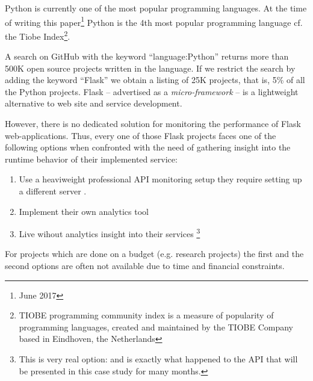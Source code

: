 \documentclass[conference]{IEEEtran}
\begin{document}
 

Python is currently one of the most popular programming languages. At the time of writing this paper\footnote{June 2017} Python is the 4th most popular programming language cf. the Tiobe Index\footnote{TIOBE programming community index is a measure of popularity of programming languages, created and maintained by the TIOBE Company based in Eindhoven, the Netherlands}. 


A search on GitHub with the keyword ``language:Python'' returns more than 500K open source projects written in the language. If we restrict the search by adding the keyword ``Flask'' we obtain a listing of 25K projects, that is, 5\% of all the Python projects. Flask -- advertised as a {\em micro-framework} -- is a lightweight alternative to web site and service development. 


However, there is no dedicated solution for monitoring the performance of Flask web-applications. Thus, every one of those Flask projects faces one of the following options when confronted with the need of gathering insight into the runtime behavior of their implemented service: 

  \begin{enumerate}

    \item Use a heaviweight professional API monitoring setup they require setting up a different server . 

    \item Implement their own analytics tool 

    \item Live wihout analytics insight into their services \footnote{This is very real option: and is exactly what happened to the API that will be presented in this case study for many months. }

  \end{enumerate}


For projects which are done on a budget (e.g. research projects) the first and the second options are often not available due to time and financial constraints. 
\end{document}
